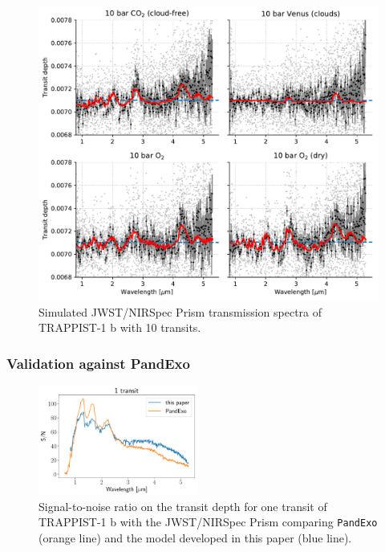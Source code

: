 \begin{figure}
    \centering
    \includegraphics[scale=0.8]{libra/smart.pdf}
    \caption{Simulated JWST/NIRSpec Prism transmission spectra of TRAPPIST-1 b with 10 transits.}
    \label{fig:my_label}
\end{figure}

\subsubsection{Validation against PandExo}

\begin{figure}
\centering
\includegraphics[width=0.47\textwidth]{libra/pandexo_libra_compare.pdf}
\caption{Signal-to-noise ratio on the transit depth for one transit of TRAPPIST-1 b with the JWST/NIRSpec Prism comparing \texttt{PandExo} (orange line) and the model developed in this paper (blue line).}
\label{fig:pandexo_snr}
\end{figure}

